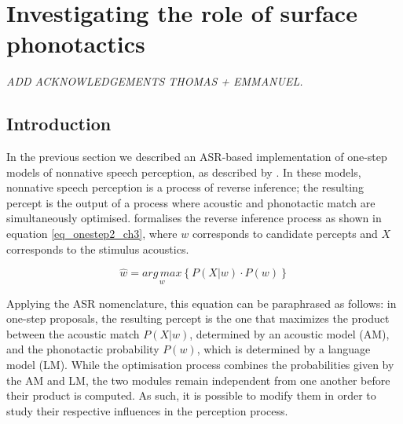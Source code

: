 

\newpage
\section{Investigating the role of surface phonotactics} \label{3-surfphono}

\small{\textit{{\color{red}ADD ACKNOWLEDGEMENTS THOMAS + EMMANUEL.\\}}}

\subsection{Introduction}

In the previous section we described an ASR-based implementation of one-step models of nonnative speech perception, as described by \cite{dupoux2011, wilson2014}. In these models, nonnative speech perception is a process of reverse inference; the resulting percept is the output of a process where acoustic and phonotactic match are simultaneously optimised. \cite{wilson2014} formalises the reverse inference process as shown in equation \ref{eq_onestep2_ch3}, where $w$ corresponds to candidate percepts and $X$ corresponds to the stimulus acoustics.

\begin{equation}
  \widehat{w} = \underset{w}{arg\,max} \left \{ P(X|w) \cdot P(w) \right \}
  \label{eq_onestep2_ch3}
\end{equation}

Applying the ASR nomenclature, this equation can be paraphrased as follows: in one-step proposals, the resulting percept is the one that maximizes the product between the acoustic match $P(X|w)$, determined by an acoustic model (AM), and the phonotactic probability  $P(w)$, which is determined by a language model (LM).
While the optimisation process combines the probabilities given by the AM and LM, the two modules remain independent from one another before their product is computed. As such, it is possible to modify them in order to study their respective influences in the perception process.   

